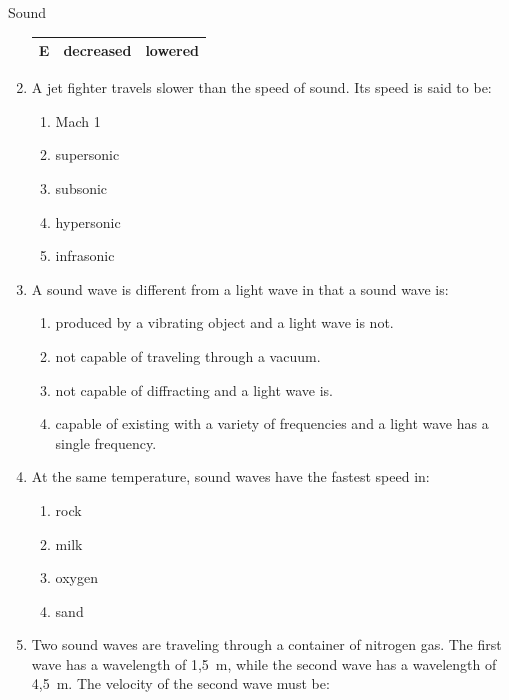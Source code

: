 \begin{eocexercises}{Sound}
\begin{enumerate}[noitemsep, label=\textbf{\arabic*}. ]
\begin{table}[H]
\begin{center}
\begin{tabular}{|l|l|l|}
        E &
        decreased &
        lowered \\ \hline
    \end{tabular}
      \end{center}
\end{table}
    \par
          \label{m38800*uid66}\item A jet fighter travels slower than the speed of sound. Its speed is said to be:
\label{m38800*id186857}\begin{enumerate}[noitemsep, label=\textbf{\alph*}. ] 
            \label{m38800*uid67}\item Mach 1
\label{m38800*uid68}\item supersonic
\label{m38800*uid69}\item subsonic
\label{m38800*uid70}\item hypersonic
\label{m38800*uid71}\item infrasonic
\end{enumerate}
                \label{m38800*uid72}\item A sound wave is different from a light wave in that a sound wave is:
\label{m38800*id186936}\begin{enumerate}[noitemsep, label=\textbf{\alph*}. ] 
            \label{m38800*uid73}\item produced by a vibrating object and a light wave is not.
\label{m38800*uid74}\item not capable of traveling through a vacuum.
\label{m38800*uid75}\item not capable of diffracting and a light wave is.
\label{m38800*uid76}\item capable of existing with a variety of frequencies and a light wave has a single frequency.
\end{enumerate}
                \label{m38800*uid77}\item At the same temperature, sound waves have the fastest speed in:
\label{m38800*id187004}\begin{enumerate}[noitemsep, label=\textbf{\alph*}. ] 
            \label{m38800*uid78}\item rock
\label{m38800*uid79}\item milk
\label{m38800*uid80}\item oxygen
\label{m38800*uid81}\item sand
\end{enumerate}
                \label{m38800*uid82}\item Two sound waves are traveling through a container of nitrogen gas. The first wave has a wavelength of 1,5~m, while the second wave has a wavelength of 4,5~m. The velocity of the second wave must be:

\end{enumerate}
\end{eocexercises}

